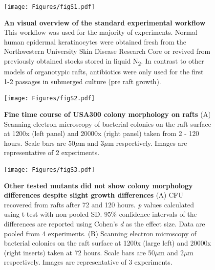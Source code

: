 \documentclass[10pt,letterpaper]{article}
\begin{document}
\begin{figure}[H]
\begin{adjustwidth}{-2.25in}{0in}
\texttt{[image: Figures/figS1.pdf]}
\caption[An visual overview of the standard experimental workflow]{
\textbf{An visual overview of the standard experimental workflow}
This workflow was used for the majority of experiments. Normal human epidermal keratinocytes were obtained fresh from the Northwestern University Skin Disease Research Core or revived from previously obtained stocks stored in liquid N\textsubscript{2}. In contrast to other models of organotypic rafts, antibiotics were only used for the first 1-2 passages in submerged culture (pre raft growth).}
\label{figS1}
\end{adjustwidth}
\end{figure}

\begin{figure}[H]
\begin{adjustwidth}{-2.25in}{0in}
\texttt{[image: Figures/figS2.pdf]}
\caption[Fine time course of USA300 colony morphology on rafts]{
\textbf{Fine time course of USA300 colony morphology on rafts} 
	(A) Scanning electron microscopy of bacterial colonies on the raft surface at 1200x (left panel) and 20000x (right panel) taken from 2 - 120 hours. Scale bars are 50$\mu$m and 3$\mu$m respectively. Images are representative of 2 experiments.}
    \label{figS2}
    \end{adjustwidth}
\end{figure}

\begin{figure}[H]
\begin{adjustwidth}{-2.25in}{0in}
\texttt{[image: Figures/figS3.pdf]}
\caption[Other tested mutants did not show colony morphology differences despite slight growth differences]{
	\textbf{Other tested mutants did not show colony morphology differences despite slight growth differences}
	(A) CFU recovered from rafts after 72 and 120 hours. \textit{p} values calculated using t-test with non-pooled SD. 95\% confidence intervals of the differences are reported using Cohen's \textit{d} as the effect size. Data are pooled from 4 experiments.
	(B) Scanning electron microscopy of bacterial colonies on the raft surface at 1200x (large left) and 20000x (right inserts) taken at 72 hours. Scale bars are 50$\mu$m and 2$\mu$m respectively. Images are representative of 3 experiments.}
        \label{figS3}
        \end{adjustwidth}
\end{figure}
\end{document}
